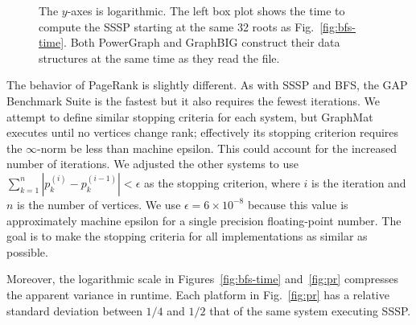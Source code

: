 \documentclass[conference]{IEEEtran}
\begin{document}
\begin{figure}
\begin{minipage}{0.365\linewidth}
	\end{minipage}
	\caption{The $y$-axes is logarithmic. The left box plot shows the time to compute the SSSP starting at the same 32 roots as Fig.~\ref{fig:bfs-time}. Both PowerGraph and GraphBIG construct their data structures at the same time as they read the file.}
	\label{fig:sssp-time}
\end{figure}

The behavior of PageRank is slightly different. As with SSSP and BFS, the GAP Benchmark Suite is the fastest but it also requires the fewest iterations. We attempt to define similar stopping criteria for each system, but GraphMat executes until no vertices change rank; effectively its stopping criterion requires the $\infty$-norm be less than machine epsilon. This could account for the increased number of iterations. We adjusted the other systems to use $\sum_{k=1}^{n} |p_k^{(i)} - p_k^{(i-1)}| < \epsilon $ as the stopping criterion, where $i$ is the iteration and $n$ is the number of vertices. We use $\epsilon = 6 \times 10^{-8}$ because this value is approximately machine epsilon for a single precision floating-point number. The goal is to make the stopping criteria for all implementations as similar as possible.

Moreover, the logarithmic scale in Figures~\ref{fig:bfs-time} and~\ref{fig:pr} compresses the apparent variance in runtime. Each platform in Fig.~\ref{fig:pr} has a relative standard deviation between $1/4$ and $1/2$ that of the same system executing SSSP.
\end{document}
